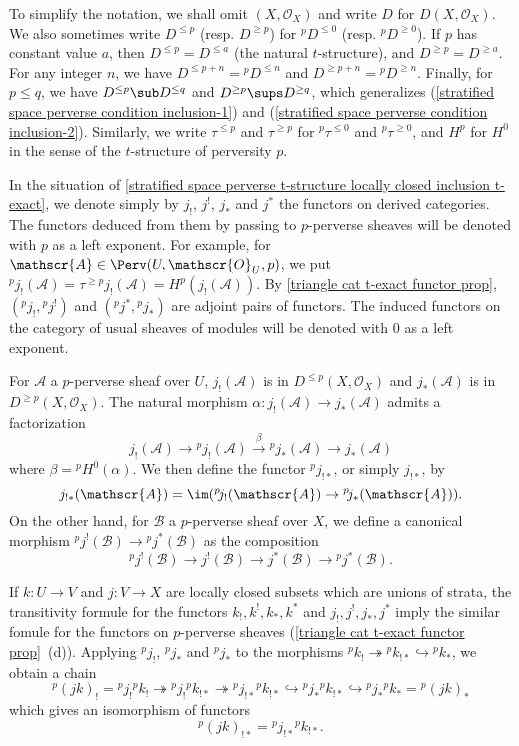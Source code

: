 To simplify the notation, we shall omit $(X,\mathscr{O}_X)$ and write $D$ for $D(X,\mathscr{O}_X)$. We also sometimes write $D^{\leq p}$ (resp. $D^{\geq p}$) for ${^p\!D^{\leq 0}}$ (resp. ${^p\!D^{\geq 0}}$). If $p$ has constant value $a$, then $D^{\leq p}=D^{\leq a}$ (the natural $t$-structure), and $D^{\geq p}=D^{\geq a}$. For any integer $n$, we have $D^{\leq p+n}={^p\!D^{\leq n}}$ and $D^{\geq p+n}={^p\!D^{\geq n}}$. Finally, for $p\leq q$, we have $D^{\leq p}\sub D^{\leq q}$ and $D^{\geq p}\sups D^{\geq q}$, which generalizes (\ref{stratified space perverse condition inclusion-1}) and (\ref{stratified space perverse condition inclusion-2}). Similarly, we write $\tau^{\leq p}$ and $\tau^{\geq p}$ for ${^p\!\tau^{\leq 0}}$ and ${^p\!\tau^{\geq 0}}$, and $H^p$ for $H^0$ in the sense of the $t$-structure of perversity $p$.\par
In the situation of \cref{stratified space perverse t-structure locally closed inclusion t-exact}, we denote simply by $j_!$, $j^!$, $j_*$ and $j^*$ the functors on derived categories. The functors deduced from them by passing to $p$-perverse sheaves will be denoted with $p$ as a left exponent. For example, for $\mathscr{A}\in\Perv(U,\mathscr{O}_U,p)$, we put ${^p\!j_!}(\mathscr{A})=\tau^{\geq p}j_!(\mathscr{A})=H^p(j_!(\mathscr{A}))$. By \cref{triangle cat t-exact functor prop}, $({^p\!j_!},{^p\!j^!})$ and $({^p\!j^*},{^p\!j_*})$ are adjoint pairs of functors. The induced functors on the category of usual sheaves of modules will be denoted with $0$ as a left exponent.\par
For $\mathscr{A}$ a $p$-perverse sheaf over $U$, $j_!(\mathscr{A})$ is in $D^{\leq p}(X,\mathscr{O}_X)$ and $j_*(\mathscr{A})$ is in $D^{\geq p}(X,\mathscr{O}_X)$. The natural morphism $\alpha:j_!(\mathscr{A})\to j_*(\mathscr{A})$ admits a factorization
\[j_!(\mathscr{A})\to{^p\!j_!}(\mathscr{A})\stackrel{\beta}{\to}{^p\!j_*}(\mathscr{A})\to j_*(\mathscr{A})\]
where $\beta={^p\!H^0}(\alpha)$. We then define the functor ${^p\!j_{!*}}$, or simply $j_{!*}$, by
\[j_{!*}(\mathscr{A})=\im({^p\!j_!}(\mathscr{A})\to {^p\!j_*}(\mathscr{A})).\]
On the other hand, for $\mathscr{B}$ a $p$-perverse sheaf over $X$, we define a canonical morphism ${^p\!j^!}(\mathscr{B})\to {^p\!j^*}(\mathscr{B})$ as the composition
\[{^p\!j^!}(\mathscr{B})\to j^!(\mathscr{B})\to j^*(\mathscr{B})\to {^p\!j^*}(\mathscr{B}).\]

If $k:U\to V$ and $j:V\to X$ are locally closed subsets which are unions of strata, the transitivity formule for the functors $k_!,k^!,k_*,k^*$ and $j_!,j^!,j_*,j^*$ imply the similar fomule for the functors on $p$-perverse sheaves (\cref{triangle cat t-exact functor prop}~(d)). Applying ${^p\!j_!}$, ${^p\!j_*}$ and ${^p\!j_*}$ to the morphisms ${^p\!k_!}\twoheadrightarrow {^p\!k_{!*}}\hookrightarrow {^p\!k_*}$, we obtain a chain
\[{^p\!(jk)_!}={^p\!j_!}{^p\!k_!}\twoheadrightarrow {^p\!j_!}{^p\!k_{!*}}\twoheadrightarrow {^p\!j_{!*}}{^p\!k_{!*}}\hookrightarrow {^p\!j_*}{^p\!k_{!*}}\hookrightarrow {^p\!j_*}{^p\!k_*}={^p\!(jk)_*}\]
which gives an isomorphism of functors
\begin{equation}\label{stratified space perverse t-structure j_!* transitivity}
{^p\!(jk)_{!*}}={^p\!j_{!*}}{^p\!k_{!*}}.
\end{equation}

